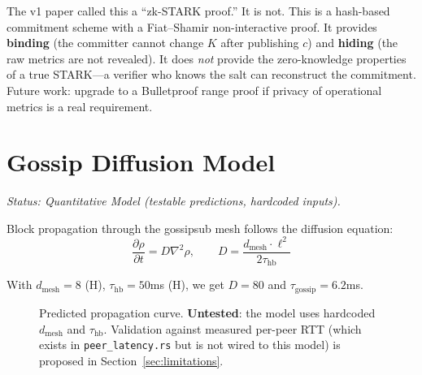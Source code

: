 \documentclass[11pt,a4paper,twocolumn]{article}
\begin{document}
\begin{honestybox}
The v1 paper called this a ``zk-STARK proof.'' It is not. This is a hash-based commitment scheme with a Fiat--Shamir non-interactive proof. It provides \textbf{binding} (the committer cannot change $K$ after publishing $c$) and \textbf{hiding} (the raw metrics are not revealed). It does \emph{not} provide the zero-knowledge properties of a true STARK---a verifier who knows the salt can reconstruct the commitment. Future work: upgrade to a Bulletproof range proof if privacy of operational metrics is a real requirement.
\end{honestybox}

\section{Gossip Diffusion Model}

\emph{Status: \textcolor{hardcoded}{Quantitative Model} (testable predictions, hardcoded inputs).}

Block propagation through the gossipsub mesh follows the diffusion equation:
\begin{equation}
\frac{\partial \rho}{\partial t} = D \nabla^2 \rho, \qquad D = \frac{d_{\text{mesh}} \cdot \ell^2}{2\tau_{\text{hb}}}
\end{equation}

With $d_{\text{mesh}} = 8$ (\textcolor{hardcoded}{H}), $\tau_{\text{hb}} = 50$ms (\textcolor{hardcoded}{H}), we get $D = 80$ and $\tau_{\text{gossip}} = 6.2$ms.

\begin{figure}[H]
\centering
{}
\caption{Predicted propagation curve. \textbf{Untested}: the model uses hardcoded $d_{\text{mesh}}$ and $\tau_{\text{hb}}$. Validation against measured per-peer RTT (which exists in \texttt{peer\_latency.rs} but is not wired to this model) is proposed in Section~\ref{sec:limitations}.}
\label{fig:diffusion}
\end{figure}
\end{document}
